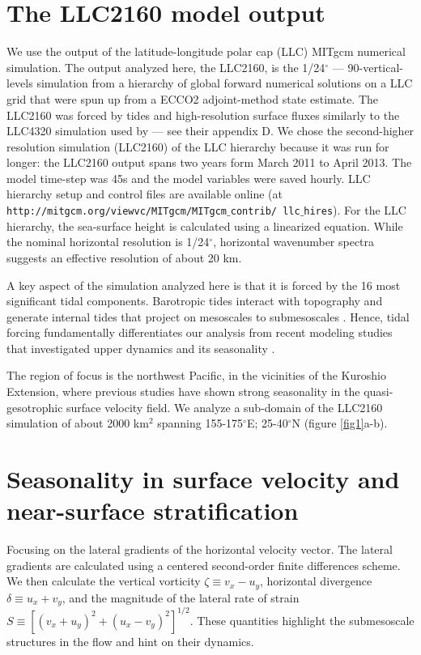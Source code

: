 \documentclass[grl]{agutex2015}
\begin{document}
\begin{article}
\section{The LLC2160 model output}
We use the output of the latitude-longitude polar cap (LLC)
MITgcm  numerical simulation. The output analyzed here, the LLC2160,
is the 1/24$^\circ$ --- 90-vertical-levels simulation from a hierarchy of global
forward numerical solutions on a LLC grid \citep{forget_etal2015} that were
spun up from a ECCO2 adjoint-method state estimate. The LLC2160 was forced by
tides and high-resolution surface fluxes similarly to the LLC4320 simulation
used by \citet{rocha_etal2016} --- see their appendix D. We chose the second-higher
resolution  simulation (LLC2160) of the LLC hierarchy because it was run for longer:
the LLC2160 output spans two years form March 2011 to April 2013. The model time-step
was 45s and the model variables were saved hourly. LLC hierarchy setup
and control files are available online
(at \texttt{http://mitgcm.org/viewvc/MITgcm/MITgcm$\_$contrib/
llc$\_$hires}). For the LLC hierarchy, the sea-surface height is calculated
using a linearized equation. While the nominal horizontal resolution is 1/24$^\circ$,
 horizontal wavenumber spectra suggests an effective resolution of about 20 km.


A key aspect of the simulation analyzed here is that it is forced by
the 16 most significant tidal components.
Barotropic tides interact with topography and generate internal
tides that project on mesoscales to submesoscales
\citep{rocha_etal2016}. Hence, tidal forcing fundamentally differentiates our analysis
from recent modeling studies that investigated upper dynamics
and its seasonality \citep{sasaki_etal2014,qiu_etal2014}.

The region of focus is the northwest Pacific, in the vicinities of the Kuroshio
Extension, where previous studies have
shown strong seasonality in the quasi-gesotrophic surface velocity field.
We analyze a sub-domain of the LLC2160 simulation of about 2000 km$^2$
spanning 155-175$^\circ$E; 25-40$^\circ$N (figure \ref{fig1}a-b).

\section{Seasonality in surface velocity and near-surface stratification}

Focusing on the lateral gradients of the horizontal velocity vector.
The lateral gradients are calculated using a centered
second-order finite differences scheme. We then calculate
the vertical vorticity $\zeta \equiv v_x - u_y$,
horizontal divergence $\delta \equiv u_x + v_y$, and the magnitude
of the lateral rate of strain $S \equiv [(v_x+u_y)^2 + (u_x-v_y)^2]^{1/2}$.
These quantities highlight the submesoscale structures in the flow
and hint on their dynamics.


\end{article}
\end{document}

